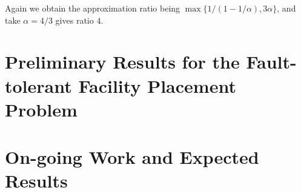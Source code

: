 \documentclass{article}
\begin{document}
Again we obtain the approximation ratio being $\max\{1/(1-1/\alpha),
3\alpha\}$, and take $\alpha = 4/3$ gives ratio $4$.


\section{Preliminary Results for the Fault-tolerant Facility Placement
  Problem}

\section{On-going Work and Expected Results}
\end{document}
